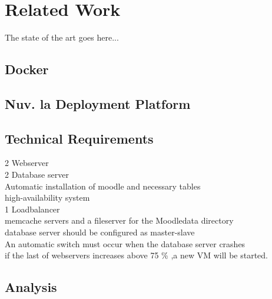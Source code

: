 \chapter{Related Work}
\label{cha:relatedwork}

The state of the art goes here...
\section{Docker}
\section{Nuv. la Deployment Platform}
\section{Technical Requirements}
\begin{description}
\item[2 Webserver]
\item[2 Database server]
\item[Automatic installation of moodle and necessary tables]
\item[high-availability system]
\item[1 Loadbalancer]
\item[memcache servers and a fileserver for the Moodledata directory]
\item[database server should be configured as master-slave]
\item[An automatic switch must occur when the database server crashes]
\item[if the last of webservers increases above 75 \% ,a new VM will be started.]
\end{description}
\section{Analysis}